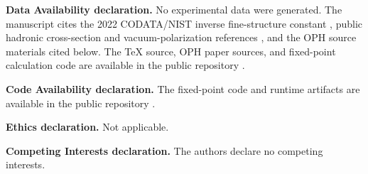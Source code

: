 \documentclass[11pt]{article}
\theoremstyle{remark}
\begin{document}
\textbf{Data Availability declaration.} No experimental data were generated. The manuscript cites the 2022 CODATA/NIST inverse fine-structure constant \cite{nist-value,nist-2022}, public hadronic cross-section and vacuum-polarization references \cite{pdg-xsect,dhmz,knt19}, and the OPH source materials cited below. The TeX source, OPH paper sources, and fixed-point calculation code are available in the public repository \cite{oph-code}.

\textbf{Code Availability declaration.} The fixed-point code and runtime artifacts are available in the public repository \cite{oph-code}.

\textbf{Ethics declaration.} Not applicable.

\textbf{Competing Interests declaration.} The authors declare no competing interests.
\end{document}
